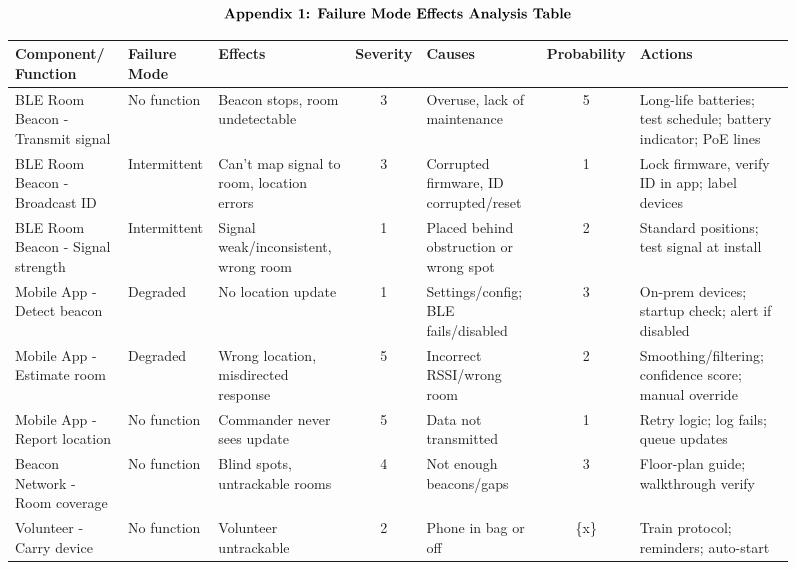 \documentclass[english,12pt,a4paper,titlepage]{article}
\begin{document}
	\pagebreak
	\[
	\begin{array}{cc}
		\mbox{\bfseries{Appendix 1: Failure Mode Effects Analysis Table}}
	\end{array}
	\]
		\begin{figure}[H]
		\begin{minipage}{\textwidth}
			\centering
		\end{minipage}
		\centering
		\scriptsize
		\begin{tabular}{>{\raggedright\arraybackslash}p{2.4cm} >{\raggedright\arraybackslash}p{1.3cm} >{\raggedright\arraybackslash}p{2.2cm} c >{\raggedright\arraybackslash}p{1.8cm} c >{\raggedright\arraybackslash}p{2.4cm}}
			\toprule
			\textbf{Component/ Function} & \textbf{Failure Mode} & \textbf{Effects} & \textbf{Severity} & \textbf{Causes} & \textbf{Probability} & \textbf{Actions} \\
			\midrule
			BLE Room Beacon - Transmit signal & No function & Beacon stops, room undetectable & 3 & Overuse, lack of maintenance & 5 & Long-life batteries; test schedule; battery indicator; PoE lines \\
			\midrule
			BLE Room Beacon - Broadcast ID & Intermittent & Can't map signal to room, location errors & 3 & Corrupted firmware, ID corrupted/reset & 1 & Lock firmware, verify ID in app; label devices \\
			\midrule
			BLE Room Beacon - Signal strength & Intermittent & Signal weak/inconsistent, wrong room & 1 & Placed behind obstruction or wrong spot & 2 & Standard positions; test signal at install \\
			\midrule
			Mobile App - Detect beacon & Degraded & No location update & 1 & Settings/config; BLE fails/disabled & 3 & On-prem devices; startup check; alert if disabled \\
			\midrule
			Mobile App - Estimate room & Degraded & Wrong location, misdirected response & 5 & Incorrect RSSI/wrong room & 2 & Smoothing/filtering; confidence score; manual override \\
			\midrule
			Mobile App - Report location & No function & Commander never sees update & 5 & Data not transmitted & 1 & Retry logic; log fails; queue updates \\
			\midrule
			Beacon Network - Room coverage & No function & Blind spots, untrackable rooms & 4 & Not enough beacons/gaps & 3 & Floor-plan guide; walkthrough verify \\
			\midrule
			Volunteer - Carry device & No function & Volunteer untrackable & 2 & Phone in bag or off & \{x\} & Train protocol; reminders; auto-start \\
			\bottomrule
		\end{tabular}
	\end{figure}
	
\end{document}
